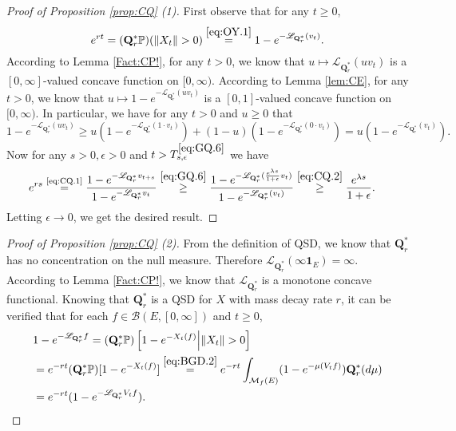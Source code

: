 \documentclass[12pt,a4paper]{amsart}
\numberwithin{equation}{section}
\theoremstyle{plain}
\theoremstyle{definition}
\theoremstyle{remark}
\begin{document}
\begin{proof}[Proof of Proposition \ref{prop:CQ} (1)]
	First observe that for any $t\geq 0$,
	\begin{equation} \label{eq:CQ.1}
	e^{rt} = (\mathbf Q_r^*\mathbb P)(\|X_t\|>0)
	\overset{\eqref{eq:OY.1}}= 1 - e^{- \mathscr L_{\mathbf Q_r^*}(v_t)}.
	\end{equation}
	According to Lemma \ref{Fact:CP!}, for any $t>0$, we know that $u\mapsto \mathscr L_{\mathbf Q_r^*} (uv_t)$ is a $[0,\infty]$-valued concave function on $[0,\infty)$.
	According to Lemma \ref{lem:CE}, for any $t>0$, we know that $u \mapsto 1 - e^{- \mathscr L_{\mathbf Q_r^*}(uv_t)}$ is a $[0,1]$-valued concave function on $[0, \infty)$.
	In particular, we have for any $t>0$ and $u \geq 0$ that
	\begin{equation} \label{eq:CQ.2}
		1 - e^{- \mathscr L_{\mathbf Q_r^*}(uv_t)} \geq u(1 - e^{- \mathscr L_{\mathbf Q_r^*}(1\cdot v_t)}) + (1-u) (1 - e^{- \mathscr L_{\mathbf Q_r^*}(0 \cdot v_t)})  = u(1 - e^{- \mathscr L_{\mathbf Q_r^*}(v_t)}).
	\end{equation}
	Now for any $s>0, \epsilon > 0$ and $t > T^{\eqref{eq:GQ.6}}_{s, \epsilon}$ we have
	\begin{align}
	& e^{rs} \overset{\text{\eqref{eq:CQ.1}}}= \frac{1 - e^{-\mathscr L_{\mathbf Q_r^*}v_{t+s}}}{1 - e^{-\mathscr L_{\mathbf Q_r^*}v_{t}}} 
	\overset{\eqref{eq:GQ.6}}\geq \frac{1 - e^{-\mathscr L_{\mathbf Q_r^*}( \frac{e^{\lambda s}}{1+\epsilon}v_t )}}{1 - e^{-\mathscr L_{\mathbf Q_r^*}(v_{t})}}
	\overset{\eqref{eq:CQ.2}}\geq \frac{e^{\lambda s}}{1+\epsilon}.
	\end{align}
	Letting $\epsilon \to 0$, we get the desired result.
\end{proof}

\begin{proof}[Proof of Proposition \ref{prop:CQ} (2)]
	From the definition of QSD, we know that $\mathbf Q_r^*$ has no concentration on the null measure. 
	Therefore $\mathscr L_{\mathbf Q_r^*}(\infty \mathbf 1_E) = \infty$.
	According to Lemma \ref{Fact:CP!}, we know that $\mathscr L_{\mathbf Q_r^*}$ is a monotone concave functional.
	Knowing that $\mathbf Q^*_r$ is a QSD for $X$ with mass decay rate $r$, it can be verified that for each $f\in \mathcal B(E,[0,\infty])$ and $t\geq 0$,
	\begin{align}
	&1 - e^{-\mathscr L_{\mathbf Q_r^*}f} 
	= (\mathbf Q_r^* \mathbb P) \left[1 - e^{-X_t(f)} \middle|\|X_t\|>0 \right]
	\\&= e^{-rt}(\mathbf Q_r^*\mathbb P)[1 - e^{- X_t(f)}]
	\overset{\eqref{eq:BGD.2}}= e^{-rt} \int_{\mathcal M_f(E)} (1 - e^{-\mu(V_tf)}) \mathbf Q_r^*(d\mu)
	\\&= e^{-rt} (1 - e^{- \mathscr L_{\mathbf Q_r^*}V_tf}).
	\qedhere
	\end{align}
	
\end{proof}
\end{document}

